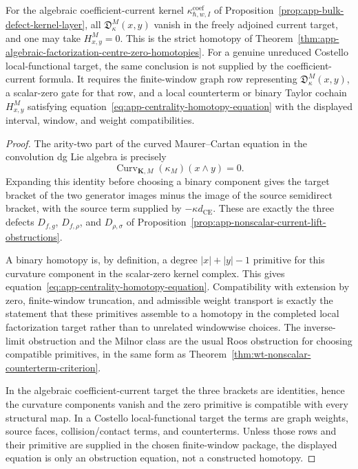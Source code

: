 \begin{thm}
  For the algebraic coefficient-current kernel
  \(\kappa^{\mathrm{coef}}_{\hbar,w,I}\) of
  Proposition~\ref{prop:app-bulk-defect-kernel-layer}, all
  \(\mathfrak D^M_\kappa(x,y)\) vanish in the freely adjoined current
  target, and one may take \(H^M_{x,y}=0\).  This is the strict
  homotopy of
  Theorem~\ref{thm:app-algebraic-factorization-centre-zero-homotopies}.
  For a genuine unreduced Costello local-functional target, the same
  conclusion is not supplied by the coefficient-current formula.  It
  requires the finite-window graph row representing
  \(\mathfrak D^M_\kappa(x,y)\), a scalar-zero gate for that row, and a
  local counterterm or binary Taylor cochain \(H^M_{x,y}\) satisfying
  equation~\eqref{eq:app-centrality-homotopy-equation} with the displayed
  interval, window, and weight compatibilities.
\end{thm}

\begin{proof}
  The arity-two part of the curved Maurer--Cartan equation in the
  convolution dg Lie algebra is precisely
  \[
    \operatorname{Curv}_{\mathbf K,M}(\kappa_M)(x\wedge y)=0.
  \]
  Expanding this identity before choosing a binary component gives the
  target bracket of the two generator images minus the image of the source
  semidirect bracket, with the source term supplied by
  \(-\kappa d_{\mathrm{CE}}\).  These are exactly the three defects
  \(D_{f,g}\), \(D_{f,\rho}\), and \(D_{\rho,\sigma}\) of
  Proposition~\ref{prop:app-nonscalar-current-lift-obstructions}.

  A binary homotopy is, by definition, a degree
  \(|x|+|y|-1\) primitive for this curvature component in the
  scalar-zero kernel complex.  This gives
  equation~\eqref{eq:app-centrality-homotopy-equation}.  Compatibility with
  extension by zero, finite-window truncation, and admissible weight
  transport is exactly the statement that these primitives assemble to a
  homotopy in the completed local factorization target rather than to
  unrelated windowwise choices.  The inverse-limit obstruction and the
  Milnor class are the usual Roos obstruction for choosing compatible
  primitives, in the same form as
  Theorem~\ref{thm:wt-nonscalar-counterterm-criterion}.

  In the algebraic coefficient-current target the three brackets are
  identities, hence the curvature components vanish and the zero
  primitive is compatible with every structural map.  In a Costello
  local-functional target the terms are graph weights, source faces,
  collision/contact terms, and counterterms.  Unless those rows and their
  primitive are supplied in the chosen finite-window package, the displayed
  equation is only an obstruction equation, not a constructed homotopy.
\end{proof}
